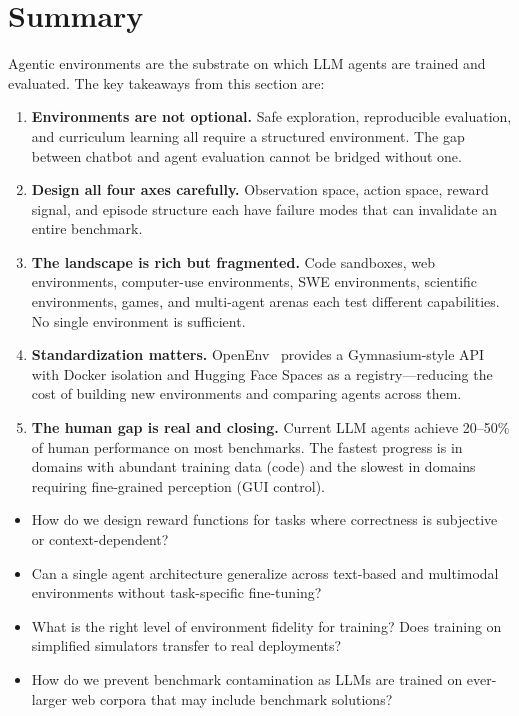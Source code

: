 \section{Summary}
\label{sec:env-summary}

Agentic environments are the substrate on which LLM agents are trained and evaluated. The key takeaways from this section are:

\begin{enumerate}
  \item \textbf{Environments are not optional.} Safe exploration, reproducible evaluation, and curriculum learning all require a structured environment. The gap between chatbot and agent evaluation cannot be bridged without one.
  \item \textbf{Design all four axes carefully.} Observation space, action space, reward signal, and episode structure each have failure modes that can invalidate an entire benchmark.
  \item \textbf{The landscape is rich but fragmented.} Code sandboxes, web environments, computer-use environments, SWE environments, scientific environments, games, and multi-agent arenas each test different capabilities. No single environment is sufficient.
  \item \textbf{Standardization matters.} OpenEnv~\cite{huggingface2025openenv} provides a Gymnasium-style API with Docker isolation and Hugging Face Spaces as a registry---reducing the cost of building new environments and comparing agents across them.
  \item \textbf{The human gap is real and closing.} Current LLM agents achieve 20--50\% of human performance on most benchmarks. The fastest progress is in domains with abundant training data (code) and the slowest in domains requiring fine-grained perception (GUI control).
\end{enumerate}

\begin{questionbox}
\begin{itemize}
  \item How do we design reward functions for tasks where correctness is subjective or context-dependent?
  \item Can a single agent architecture generalize across text-based and multimodal environments without task-specific fine-tuning?
  \item What is the right level of environment fidelity for training? Does training on simplified simulators transfer to real deployments?
  \item How do we prevent benchmark contamination as LLMs are trained on ever-larger web corpora that may include benchmark solutions?
\end{itemize}
\end{questionbox}

